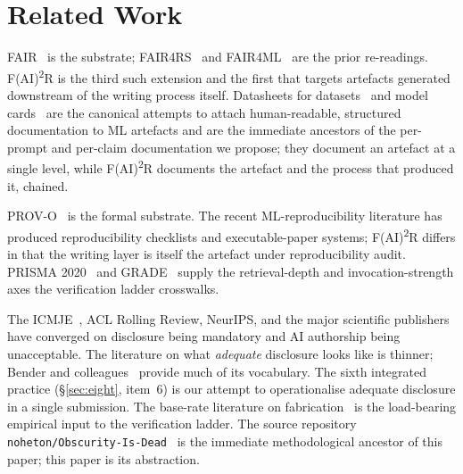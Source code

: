 \section{Related Work}
\label{sec:related}

FAIR~\cite{wilkinson2016fair} is the substrate;
FAIR4RS~\cite{chuehong2022fair4rs} and
FAIR4ML~\cite{ravi2024fair4ml} are the prior re-readings.
F(AI)\textsuperscript{2}R is the third such extension and the first
that targets artefacts generated downstream of the writing process
itself. Datasheets for datasets~\cite{gebru2021datasheets} and model
cards~\cite{mitchell2019modelcards} are the canonical attempts to
attach human-readable, structured documentation to ML artefacts and
are the immediate ancestors of the per-prompt and per-claim
documentation we propose; they document an artefact at a single
level, while F(AI)\textsuperscript{2}R documents the artefact and
the process that produced it, chained.

PROV-O~\cite{w3c2013provo} is the formal substrate. The recent
ML-reproducibility literature has produced reproducibility checklists
and executable-paper systems; F(AI)\textsuperscript{2}R differs in
that the writing layer is itself the artefact under reproducibility
audit. PRISMA 2020~\cite{page2021prisma} and
GRADE~\cite{guyatt2008grade} supply the retrieval-depth and
invocation-strength axes the verification ladder crosswalks.

The \textsc{ICMJE}~\cite{icmje2023}, ACL Rolling Review, NeurIPS, and
the major scientific publishers have converged on disclosure being
mandatory and AI authorship being unacceptable. The literature on
what \emph{adequate} disclosure looks like is thinner; Bender and
colleagues~\cite{bender2021stochastic} provide much of its
vocabulary. The sixth integrated practice
(\S\ref{sec:eight}, item~6) is our attempt to operationalise
adequate disclosure in a single submission. The base-rate
literature on
fabrication~\cite{walters2023fabrication,magesh2024legal} is the
load-bearing empirical input to the verification ladder. The source
repository \texttt{noheton/Obscurity-Is-Dead}~\cite{krebs2026obscurity}
is the immediate methodological ancestor of this paper; this paper
is its abstraction.

